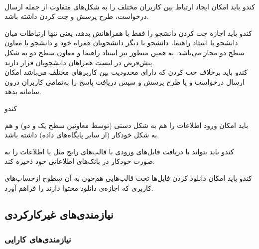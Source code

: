 \documentclass{report}
\begin{document}
\\
 کندو باید امکان ایجاد ارتباط بین کاربران مختلف را به شکل‌های متفاوت از جمله ارسال درخواست، طرح پرسش و چت کردن  داشته باشد.
 \begin{adjustwidth}{2em}{0pt}                                                                                                                                                                                                                                                                                                                                                                                                                                                  
                                                                                                                                                                                                                          کندو باید اجازه چت کردن دانشجو را فقط با همراهانش بدهد، یعنی تنها ارتباطات میان دانشجو با استاد راهنما، دانشجو با دیگر دانشجویان همراه خود و دانشجو با معاون سطح دو مجاز می‌باشد. به همین منظور نیز استاد راهنما و معاون سطح دو به شکل پیش‌فرض در لیست همراهان دانشجویان قرار دارند.
\\
          کندو باید برخلاف چت کردن که دارای محدودیت بین کاربرهای مختلف می‌باشد امکان ارسال درخواست و یا طرح پرسش و سپس دریافت پاسخ را به‌تمامی کاربران درون سامانه بدهد.
\end{adjustwidth}          
\hypertarget{oo}{کندو}
باید امکان ورود اطلاعات را هم به شکل دستی (توسط معاونین سطح یک و دو) و هم به شکل خودکار (از سایر پایگاه‌های داده) داشته باشد.
\begin{adjustwidth}{2em}{0pt} 
کندو باید بتواند با دریافت فایل‌های ورودی با قالب‌های رایج مثل 
 یا 
  اطلاعات را به صورت خودکار در بانک‌های اطلاعاتی خود ذخیره کند.
\end{adjustwidth} 
کندو باید امکان دانلود کردن فایل‌ها تحت قالب‌هایی هم‌چون  
 به آن سطوح ازحساب‌های کاربری که اجازه‌ی دانلود محتوا دارند را فراهم آورد.
 
\subsection{نیازمندی‌های غیرکارکردی}
\subsubsection*{نیازمندی‌های کارایی}
\end{document}
